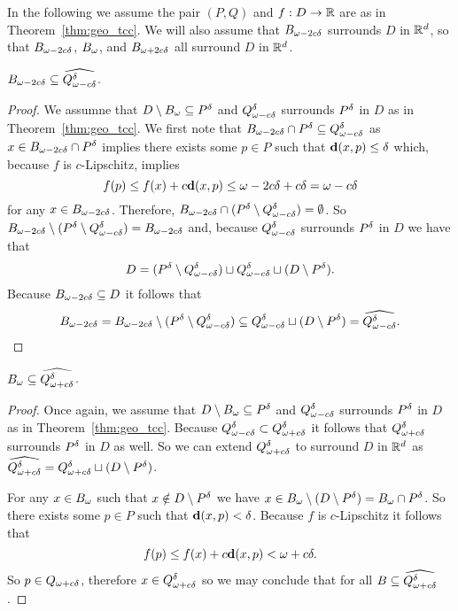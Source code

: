 
In the following we assume the pair $(P, Q)$ and $f : D\to\R$ are as in Theorem~\ref{thm:geo_tcc}.
We will also assume that $\b$ surrounds $D$ in $\R^d$, so that $\b$, $\B$, and $\BB$ all surround $D$ in $\R^d$.

\begin{lemma}
  $\b\subseteq \widehat{\Q^\of}$.
\end{lemma}
\begin{proof}
  We assumne that $D\setminus \B\subseteq \P$ and $\Q^\of$ surrounds $\P$ in $D$ as in Theorem~\ref{thm:geo_tcc}.
  We first note that $\b\cap \P\subseteq \Q^\of$ as $x\in \b\cap \P$ implies there exists some $p\in P$ such that $\dist(x, p)\leq \of$ which, because $f$ is $c$-Lipschitz, implies
  \[ f(p) \leq f(x) + c\dist(x, p)\leq \o + c\delta = \fen\]
  for any $x\in \b$.
  Therefore, $\b\cap (\P\setminus \Q^\of) = \emptyset$.
  So $\b\setminus (\P\setminus \Q^\of) = \b$ and, because $\Q^\of$ surrounds $\P$ in $D$ we have that
  \[ D = (\P\setminus \Q^\of)\sqcup \Q^\of \sqcup (D\setminus \P).\]
  Because $\b\subseteq D$ it follows that
  \[ \b = \b \setminus (\P\setminus \Q^\of)\subseteq \Q^\of\sqcup (D\setminus \P) = \widehat{\Q^\of}. \]
\end{proof}

\begin{lemma}
  $\B\subseteq \widehat{\QQ^\of}$.
\end{lemma}
\begin{proof}
  Once again, we assume that $D\setminus \B\subseteq \P$ and $\Q^\of$ surrounds $\P$ in $D$ as in Theorem~\ref{thm:geo_tcc}.
  Because $\Q^\of \subset \QQ^\of$ it follows that $\QQ^\of$ surrounds $\P$ in $D$ as well.
  So we can extend $\QQ^\of$ to surround $D$ in $\R^d$ as $\widehat{\QQ^\of} = \QQ^\of\sqcup (D\setminus\P)$.

  For any $x\in \B$ such that $x\notin D\setminus\P$ we have $x\in \B\setminus (D\setminus \P) = \B\cap \P$.
  So there exists some $p\in P$ such that $\dist(x, p) < \delta$.
  Because $f$ is $c$-Lipschitz it follows that
  \[ f(p)\leq f(x) + c\dist(x, p) < \omega + c\delta. \]
  So $p\in \QQ$, therefore $x\in \QQ^\delta$ so we may conclude that for all $B\subseteq \widehat{\QQ^\delta}$.
\end{proof}

